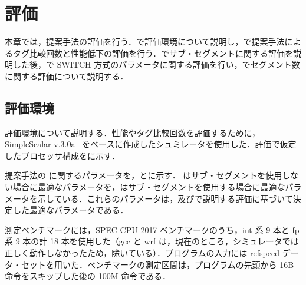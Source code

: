 
\chapter{評価}
\label{sec:eval}
本章では，提案手法の評価を行う．で評価環境について説明し，で提案手法によるタグ比較回数と性能低下の評価を行う．でサブ・セグメントに関する評価を説明した後，で SWITCH 方式のパラメータに関する評価を行い，でセグメント数に関する評価について説明する．

\section{評価環境}
\label{sec:eval_env}
評価環境について説明する．性能やタグ比較回数を評価するために，SimpleScalar v.3.0a~\cite{SimpleScalar} をベースに作成したシュミレータを使用した．評価で仮定したプロセッサ構成をに示す．

提案手法の に関するパラメータを，とに示す． はサブ・セグメントを使用しない場合に最適なパラメータを，はサブ・セグメントを使用する場合に最適なパラメータを示している．これらのパラメータは，及びで説明する評価に基づいて決定した最適なパラメータである．

測定ベンチマークには，SPEC CPU 2017 ベンチマークのうち，int 系 9 本と fp 系 9 本の計 18 本を使用した（gcc と wrf は，現在のところ，シミュレータでは正しく動作しなかったため，除いている）．プログラムの入力には refspeed データ・セットを用いた．ベンチマークの測定区間は，プログラムの先頭から 16B 命令をスキップした後の 100M 命令である．

